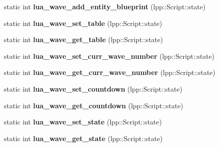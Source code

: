 \begin{DoxyCompactItemize}
\item 
static int {\bfseries lua\+\_\+wave\+\_\+add\+\_\+entity\+\_\+blueprint} (lpp\+::\+Script\+::state)\hypertarget{class_lua_interface_a4d75d252a0bbbe1d453ca3f93fc97215}{}\label{class_lua_interface_a4d75d252a0bbbe1d453ca3f93fc97215}

\item 
static int {\bfseries lua\+\_\+wave\+\_\+set\+\_\+table} (lpp\+::\+Script\+::state)\hypertarget{class_lua_interface_aa2cba470c23edf2c26b778ed3ad98b1f}{}\label{class_lua_interface_aa2cba470c23edf2c26b778ed3ad98b1f}

\item 
static int {\bfseries lua\+\_\+wave\+\_\+get\+\_\+table} (lpp\+::\+Script\+::state)\hypertarget{class_lua_interface_ad74a7d71e9df17cb1786667e5e4ca7d7}{}\label{class_lua_interface_ad74a7d71e9df17cb1786667e5e4ca7d7}

\item 
static int {\bfseries lua\+\_\+wave\+\_\+set\+\_\+curr\+\_\+wave\+\_\+number} (lpp\+::\+Script\+::state)\hypertarget{class_lua_interface_a269cb92f3cf98d650d924d8e98c38c70}{}\label{class_lua_interface_a269cb92f3cf98d650d924d8e98c38c70}

\item 
static int {\bfseries lua\+\_\+wave\+\_\+get\+\_\+curr\+\_\+wave\+\_\+number} (lpp\+::\+Script\+::state)\hypertarget{class_lua_interface_ad8a4a09fbb6f9aca1514566bfa1d80dc}{}\label{class_lua_interface_ad8a4a09fbb6f9aca1514566bfa1d80dc}

\item 
static int {\bfseries lua\+\_\+wave\+\_\+set\+\_\+countdown} (lpp\+::\+Script\+::state)\hypertarget{class_lua_interface_a8ebca9806ddef73b31451a0a90d8adaa}{}\label{class_lua_interface_a8ebca9806ddef73b31451a0a90d8adaa}

\item 
static int {\bfseries lua\+\_\+wave\+\_\+get\+\_\+countdown} (lpp\+::\+Script\+::state)\hypertarget{class_lua_interface_afddd21d8b21d0c2e9da79bccfb245675}{}\label{class_lua_interface_afddd21d8b21d0c2e9da79bccfb245675}

\item 
static int {\bfseries lua\+\_\+wave\+\_\+set\+\_\+state} (lpp\+::\+Script\+::state)\hypertarget{class_lua_interface_a2614bfea167d768d190d4f5f384d9e75}{}\label{class_lua_interface_a2614bfea167d768d190d4f5f384d9e75}

\item 
static int {\bfseries lua\+\_\+wave\+\_\+get\+\_\+state} (lpp\+::\+Script\+::state)\hypertarget{class_lua_interface_a0a05b9c8eeae45a7144dc297ebe1b000}{}\label{class_lua_interface_a0a05b9c8eeae45a7144dc297ebe1b000}


\end{DoxyCompactItemize}
